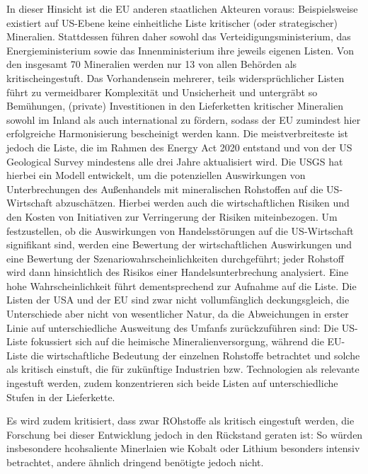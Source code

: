 \documentclass[12pt,a4paper,oneside]{book} %
\begin{document}
In dieser Hinsicht ist die EU anderen staatlichen Akteuren voraus: Beispielsweise existiert auf US-Ebene keine einheitliche Liste kritischer (oder strategischer) Mineralien. Stattdessen führen daher sowohl das Verteidigungsministerium, das Energieministerium sowie das Innenministerium ihre jeweils eigenen Listen. Von den insgesamt 70 Mineralien werden nur 13 von allen Behörden als \glqq kritisch\grqq eingestuft.\autocite{Baskaran, G.; Schwart, M.: Three U.S. Government Lists: Which Minerals Are the Most Critical?, CSIS} Das Vorhandensein mehrerer, teils widersprüchlicher Listen führt zu vermeidbarer Komplexität und Unsicherheit und untergräbt so Bemühungen, (private) Investitionen in den Lieferketten kritischer Mineralien sowohl im Inland als auch international zu fördern, sodass der EU zumindest hier erfolgreiche Harmonisierung bescheinigt werden kann.
Die meistverbreiteste ist jedoch die Liste, die im Rahmen des Energy Act 2020 entstand und von der US Geological Survey mindestens alle drei Jahre aktualisiert wird. Die USGS hat hierbei ein Modell entwickelt, um die potenziellen Auswirkungen von Unterbrechungen des Außenhandels mit mineralischen Rohstoffen auf die US-Wirtschaft abzuschätzen. Hierbei werden auch die wirtschaftlichen Risiken und den Kosten von Initiativen zur Verringerung der Risiken miteinbezogen. Um festzustellen, ob die Auswirkungen von Handelsstörungen auf die US-Wirtschaft signifikant sind, werden eine Bewertung der wirtschaftlichen Auswirkungen und eine Bewertung der Szenariowahrscheinlichkeiten durchgeführt; jeder Rohstoff wird dann hinsichtlich des Risikos einer Handelsunterbrechung analysiert. Eine hohe Wahrscheinlichkeit führt dementsprechend zur Aufnahme auf die Liste. Die Listen der USA und der EU sind zwar nicht vollumfänglich deckungsgleich, die Unterschiede aber nicht von wesentlicher Natur, da die Abweichungen in erster Linie auf unterschiedliche Ausweitung des Umfanfs zurückzuführen sind: Die US-Liste fokussiert sich auf die heimische Mineralienversorgung, während die EU-Liste die wirtschaftliche Bedeutung der einzelnen Rohstoffe betrachtet und solche als kritisch einstuft, die für zukünftige Industrien bzw. Technologien als relevante ingestuft werden, zudem konzentrieren sich beide Listen auf unterschiedliche Stufen in der Lieferkette.\autocite{PE 786.415, S. 20}

Es wird zudem kritisiert, dass zwar ROhstoffe als kritisch eingestuft werden, die Forschung bei dieser Entwicklung jedoch in den Rückstand geraten ist: So würden insbesondere hcohsaliente Minerlaien wie Kobalt oder Lithium besonders intensiv betrachtet, andere ähnlich dringend benötigte jedoch nicht.\autocite{ÖAW, Studie EP}
\end{document}

